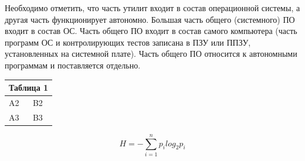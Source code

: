 \documentclass{beamer}
\begin{document}
\begin{frame}

Необходимо отметить, что часть утилит входит в состав операционной системы, а другая часть функционирует автономно. Большая часть общего (системного) ПО входит в состав ОС. Часть общего ПО входит в состав самого компьютера (часть программ ОС и контролирующих тестов записана в ПЗУ или ППЗУ, установленных на системной плате). Часть общего ПО относится к автономными программам и поставляется отдельно.

\end{frame}

\begin{frame}
    
\begin{table}[]
\begin{tabular}{|l|l|l|l|}
\hline
\multicolumn{4}{|l|}{Таблица 1}                    \\ \hline
\multicolumn{2}{|l|}{A2} & \multicolumn{2}{l|}{B2} \\ \hline
\multicolumn{2}{|l|}{A3} & \multicolumn{2}{l|}{B3} \\ \hline
\end{tabular}
\end{table}

\[H=-\sum_{i=1}^{n}p_{i}log_{2}p_{i}\]
    
\end{frame}
\end{document}
